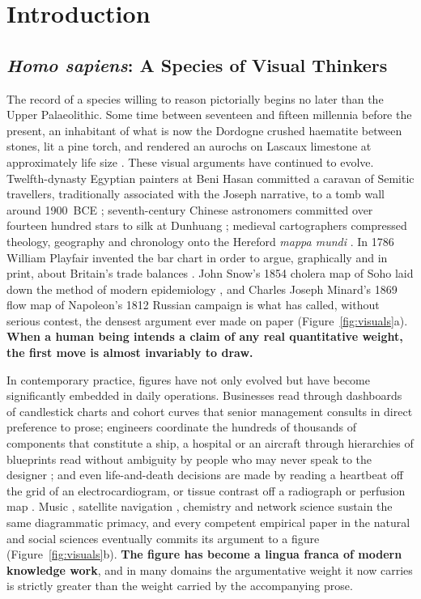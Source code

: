 \chapter{Introduction\label{chap:introduction}}

\section{\emph{Homo sapiens}: A Species of Visual Thinkers}
\label{sec:intro-species}

The record of a species willing to reason pictorially begins no later
than the Upper Palaeolithic. Some time between seventeen and fifteen
millennia before the present, an inhabitant of what is now the
Dordogne crushed haematite between stones, lit a pine torch, and
rendered an aurochs on Lascaux limestone at approximately life size
\citep{aujoulat2005splendour}. These visual arguments have continued
to evolve. Twelfth-dynasty Egyptian painters at Beni Hasan committed
a caravan of Semitic travellers, traditionally associated with the
Joseph narrative, to a tomb wall around 1900~BCE
\citep{kamrin2009aamu}; seventh-century Chinese astronomers committed
over fourteen hundred stars to silk at Dunhuang
\citep{bonnetbidaud2009dunhuang}; medieval cartographers compressed
theology, geography and chronology onto the Hereford
\emph{mappa mundi} \citep{harvey1996mappa}. In 1786 William Playfair
invented the bar chart in order to argue, graphically and in print,
about Britain's trade balances \citep{playfair1786commercial}. John
Snow's 1854 cholera map of Soho laid down the method of modern
epidemiology \citep{johnson2006ghost}, and Charles Joseph Minard's
1869 flow map of Napoleon's 1812 Russian campaign
\citep{friendly2002visions} is what \citet{tufte2001visual} has
called, without serious contest, the densest argument ever made on
paper (Figure~\ref{fig:visuals}a). \textbf{When a human being
intends a claim of any real quantitative weight, the first move
is almost invariably to draw.}

In contemporary practice, figures have not only evolved but have
become significantly embedded in daily operations. Businesses read
through dashboards of candlestick charts and cohort curves
\citep{nison2001japanese} that senior management consults in direct
preference to prose; engineers coordinate the hundreds of thousands
of components that constitute a ship, a hospital or an aircraft
through hierarchies of blueprints read without ambiguity by people
who may never speak to the designer \citep{ferguson1992engineering};
and even life-and-death decisions are made by reading a heartbeat
off the grid of an electrocardiogram, or tissue contrast off a
radiograph or perfusion map \citep{goldberger2017clinical}. Music
\citep{treitler1984reading}, satellite navigation
\citep{kaplan2017understanding}, chemistry \citep{hoffmann1995same}
and network science \citep{newman2010networks} sustain the same
diagrammatic primacy, and every competent empirical paper in the
natural and social sciences eventually commits its argument to a
figure (Figure~\ref{fig:visuals}b). \textbf{The figure has become
a lingua franca of modern knowledge work}, and in many domains
the argumentative weight it now carries is strictly greater than
the weight carried by the accompanying prose.

